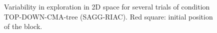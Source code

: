 \documentclass[12pt]{article}
\begin{document}
		\begin{figure}[H]
			\centering
			\caption{Variability in exploration in 2D space for several trials of condition TOP-DOWN-CMA-tree (SAGG-RIAC). Red square: initial position of the block.}
			\label{diversity}
		\end{figure}
		
\end{document}
